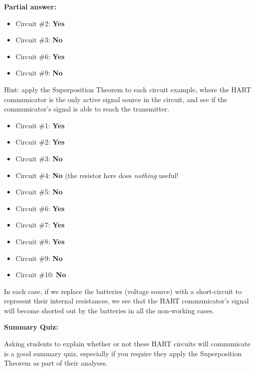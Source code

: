
\noindent
{\bf Partial answer:}

\begin{itemize}
\item{} Circuit \#2: {\bf Yes}
\item{} Circuit \#3: {\bf No}
\item{} Circuit \#6: {\bf Yes}
\item{} Circuit \#9: {\bf No}
\end{itemize}

Hint: apply the Superposition Theorem to each circuit example, where the HART communicator is the only active signal source in the circuit, and see if the communicator's signal is able to reach the transmitter.







\begin{itemize}
\item{} Circuit \#1: {\bf Yes}
\item{} Circuit \#2: {\bf Yes}
\item{} Circuit \#3: {\bf No}
\item{} Circuit \#4: {\bf No} (the resistor here does {\it nothing} useful!
\item{} Circuit \#5: {\bf No}
\item{} Circuit \#6: {\bf Yes}
\item{} Circuit \#7: {\bf Yes}
\item{} Circuit \#8: {\bf Yes}
\item{} Circuit \#9: {\bf No}
\item{} Circuit \#10: {\bf No}
\end{itemize}

In each case, if we replace the batteries (voltage source) with a short-circuit to represent their internal resistances, we see that the HART communicator's signal will become shorted out by the batteries in all the non-working cases.





\vfil \eject

\noindent
{\bf Summary Quiz:}

Asking students to explain whether or not these HART circuits will communicate is a good summary quiz, especially if you require they apply the Superposition Theorem as part of their analyses.



